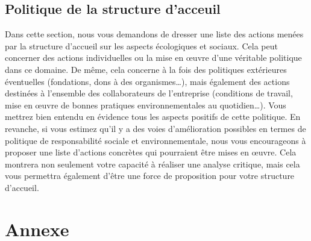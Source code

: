 \documentclass[12pt]{article}
\begin{document}
\subsection{Politique de la structure d'acceuil}
Dans cette section, nous vous demandons de dresser une liste des actions menées par la structure d’accueil sur les aspects écologiques et sociaux. Cela peut concerner des actions individuelles ou la mise en œuvre d’une véritable politique dans ce domaine. De même, cela concerne à la fois des politiques extérieures éventuelles (fondations, dons à des organismes…), mais également des actions destinées à l’ensemble des collaborateurs de l’entreprise (conditions de travail, mise en œuvre de bonnes pratiques environnementales au quotidien…). Vous mettrez bien entendu en évidence tous les aspects positifs de cette politique. En revanche, si vous estimez qu’il y a des voies d’amélioration possibles en termes de politique de responsabilité sociale et environnementale, nous vous encourageons à proposer une liste d’actions concrètes qui pourraient être mises en œuvre. Cela montrera non seulement votre capacité à réaliser une analyse critique, mais cela vous permettra également d’être une force de proposition pour votre structure d’accueil.
\newpage
\section{Annexe}
\end{document}
